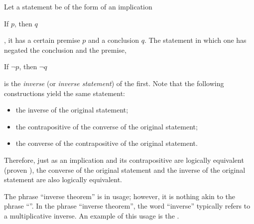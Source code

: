 \documentclass[12pt]{article}
\begin{document}

Let a statement be of the form of an implication

\begin{center}
If $p$, then $q$
\end{center}

, it has a certain premise $p$ and a conclusion $q$. The statement in which one has negated the conclusion and the premise,

\begin{center}
If $\neg p$, then $\neg q$
\end{center}

is the \emph{inverse} (or \emph{inverse statement}) of the first.  Note that the following constructions yield the same statement:

\begin{itemize}
\item the inverse of the original statement;
\item the contrapositive of the converse of the original statement;
\item the converse of the contrapositive of the original statement.
\end{itemize}

Therefore, just as an implication and its contrapositive are logically equivalent (proven ), the converse of the original statement and the inverse of the original statement are also logically equivalent.

The phrase ``inverse theorem'' is in  usage; however, it is nothing akin to the phrase ``''.  In the phrase ``inverse theorem'', the word ``inverse'' typically refers to a multiplicative inverse.  An example of this usage is the .
\end{document}
